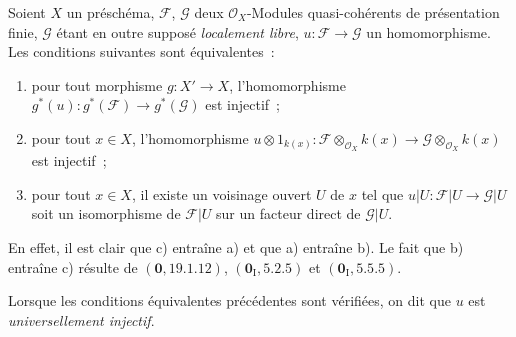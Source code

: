 \begin{remark}[11.9.18]
\label{IV.11.9.18-fr}
Soient $X$ un préschéma, $\mathcal F$, $\mathcal G$ deux
$\mathcal O_X$-Modules quasi-cohérents de présentation finie, $\mathcal G$
étant en outre supposé \emph{localement libre},
$u:\mathcal F\to\mathcal G$ un homomorphisme. Les conditions suivantes sont
équivalentes~:
\begin{enumerate}[label=\emph{\alph*)}]
  \item pour tout morphisme $g:X'\to X$, l'homomorphisme
  $g^*(u):g^*(\mathcal F)\to g^*(\mathcal G)$ est injectif~;
  \item pour tout $x\in X$, l'homomorphisme
  $u\otimes 1_{k(x)}:\mathcal F\otimes_{\mathcal O_X}k(x)
  \to\mathcal G\otimes_{\mathcal O_X}k(x)$ est injectif~;
  \item pour tout $x\in X$, il existe un voisinage ouvert $U$ de $x$ tel que
  $u|U:\mathcal F|U\to\mathcal G|U$ soit un isomorphisme de $\mathcal F|U$
  sur un facteur direct de $\mathcal G|U$.
\end{enumerate}

En effet, il est clair que c) entraîne a) et que a) entraîne b). Le fait que
b) entraîne c) résulte de $(\mathbf 0,19.1.12)$,
$(\mathbf 0_{\mathrm I},5.2.5)$ et $(\mathbf 0_{\mathrm I},5.5.5)$.

Lorsque les conditions équivalentes précédentes sont vérifiées, on dit que
$u$ est \emph{universellement injectif}.
\end{remark}
